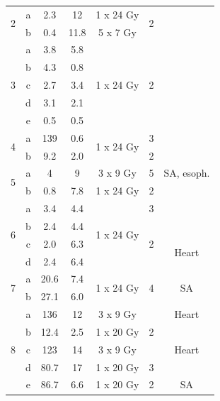 \documentclass[type=dr, dr=rernat, accentcolor=tud7b,colorbacktitle, bigchapter, openright, twoside, 12pt ]{tudthesis}
\begin{document}
\begin{table}[H]
\begin{tabular}{c|c|c|c|c|c|c}
		 \hline
		 \multirow{2}{*}{2} & a & 2.3 & 12  & 1 x 24 Gy & \multirow{2}{*}{2} \\
		 & b & 0.4 & 11.8  & 5 x 7 Gy &  \\
		 \hline
		 \multirow{5}{*}{3} & a & 3.8 & 5.8  & \multirow{5}{*}{1 x 24 Gy} & \multirow{5}{*}{2} \\
		  & b & 4.3 & 0.8  &  & \\
		  & c & 2.7 & 3.4  &  & \\
		  & d & 3.1 & 2.1  &  & \\
		  & e & 0.5 & 0.5  &  & \\
		  \hline
		  \multirow{2}{*}{4} & a & 139 & 0.6 & \multirow{2}{*}{1 x 24 Gy} & 3 \\
		 & b & 9.2 & 2.0  &  & 2 \\
		 \hline
		 \multirow{2}{*}{5} & a & 4 & 9  & 3 x 9 Gy  & 5 & SA, esoph. \\
		 & b & 0.8 & 7.8  & 1 x 24 Gy & 2 \\
		 \hline
		 \multirow{4}{*}{6} & a & 3.4   & 4.4    & \multirow{4}{*}{1 x 24 Gy} & 3  \\
				    & b & 2.4 & 4.4  & & \multirow{3}{*}{2} \\
				    & c & 2.0 & 6.3  & & & \multirow{2}{*}{Heart}\\
				    & d & 2.4 & 6.4  & & \\
		\hline	    
		\multirow{2}{*}{7} & a & 20.6 & 7.4 & \multirow{2}{*}{1 x 24 Gy} & \multirow{2}{*}{4} & \multirow{2}{*}{SA}  \\
		 & b & 27.1 & 6.0  &  &   \\
		 \hline
		 \multirow{5}{*}{8} & a & 136 & 12  & 3 x 9 Gy & \multirow{3}{*}{2} & Heart\\
		  & b & 12.4 & 2.5  & 1 x 20 Gy &  &\\
		  & c & 123 & 14  & 3 x 9 Gy &  &Heart \\
		 & d & 80.7 & 17  & 1 x 20 Gy & 3  &\\
		 & e & 86.7 & 6.6  & 1 x 20 Gy & 2 & SA \\
		 

\end{tabular}
\end{table}
\end{document}
